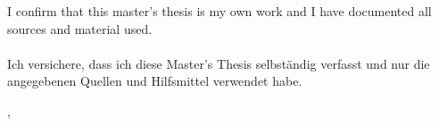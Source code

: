 \thispagestyle{empty}
\vspace*{0.65\textheight}
\noindent
I confirm that this master's thesis is my own work and I have documented all sources and material used. \\\\
Ich versichere, dass ich diese Master's Thesis selbständig verfasst und nur die angegebenen Quellen und Hilfsmittel verwendet habe.

\vspace{15mm}
\noindent
\getSubmissionLocation{}, \getSubmissionDate{} \hspace{5cm} \getAuthor{}

\cleardoublepage{}

